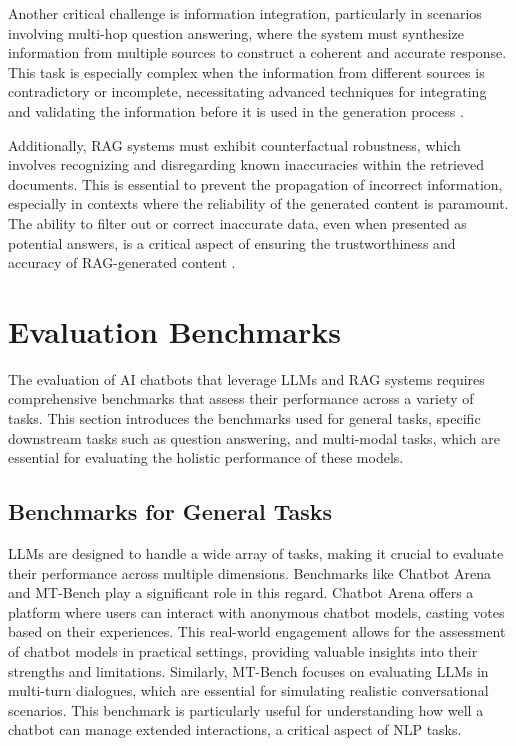 Another critical challenge is information integration, particularly in scenarios involving multi-hop question answering, where the system must synthesize information from multiple sources to construct a coherent and accurate response. This task is especially complex when the information from different sources is contradictory or incomplete, necessitating advanced techniques for integrating and validating the information before it is used in the generation process \cite{luo2023divide}.

Additionally, RAG systems must exhibit counterfactual robustness, which involves recognizing and disregarding known inaccuracies within the retrieved documents. This is essential to prevent the propagation of incorrect information, especially in contexts where the reliability of the generated content is paramount. The ability to filter out or correct inaccurate data, even when presented as potential answers, is a critical aspect of ensuring the trustworthiness and accuracy of RAG-generated content \cite{lewis2020retrieval}.

\section{Evaluation Benchmarks}

The evaluation of AI chatbots that leverage LLMs and RAG systems requires comprehensive benchmarks that assess their performance across a variety of tasks. This section introduces the benchmarks used for general tasks, specific downstream tasks such as question answering, and multi-modal tasks, which are essential for evaluating the holistic performance of these models.

\subsection{Benchmarks for General Tasks}

LLMs are designed to handle a wide array of tasks, making it crucial to evaluate their performance across multiple dimensions. Benchmarks like Chatbot Arena \cite{lmsys2024arena} and MT-Bench \cite{zheng2024judging} play a significant role in this regard. Chatbot Arena offers a platform where users can interact with anonymous chatbot models, casting votes based on their experiences. This real-world engagement allows for the assessment of chatbot models in practical settings, providing valuable insights into their strengths and limitations. Similarly, MT-Bench focuses on evaluating LLMs in multi-turn dialogues, which are essential for simulating realistic conversational scenarios. This benchmark is particularly useful for understanding how well a chatbot can manage extended interactions, a critical aspect of NLP tasks.

